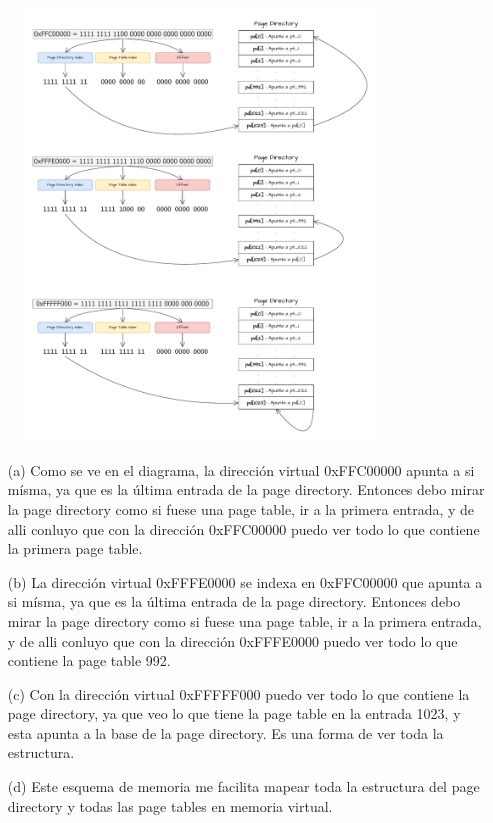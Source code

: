 \documentclass[12pt]{article}
\begin{document}
\begin{figure}[h]
    \centering
    \includegraphics[width=0.83\textwidth]{ej18.pdf}
\end{figure}

\begin{rta}
    \begin{itemize}
        \item[(a)] Como se ve en el diagrama, la dirección virtual 0xFFC00000 apunta a si mísma, ya que es la última entrada de la page directory. Entonces debo mirar la page directory como si fuese una page table, ir a la primera entrada, y de alli conluyo que con la dirección 0xFFC00000 puedo ver todo lo que contiene la primera page table. 
        \item[(b)] La dirección virtual 0xFFFE0000 se indexa en 0xFFC00000 que apunta a si mísma, ya que es la última entrada de la page directory. Entonces debo mirar la page directory como si fuese una page table, ir a la primera entrada, y de alli conluyo que con la dirección 0xFFFE0000 puedo ver todo lo que contiene la page table 992.
        \item[(c)] Con la dirección virtual 0xFFFFF000 puedo ver todo lo que contiene la page directory, ya que veo lo que tiene la page table en la entrada 1023, y esta apunta a la base de la page directory. Es una forma de ver toda la estructura.
        \item[(d)] Este esquema de memoria me facilita mapear toda la estructura del page directory y todas las page tables en memoria virtual.
    \end{itemize}
\end{rta}
\end{document}
